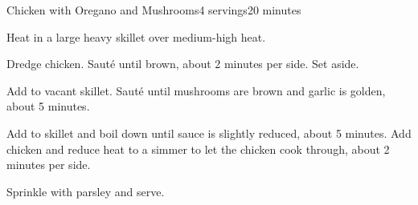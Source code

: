 \documentclass[../Cookbook.tex]{subfiles}
\begin{document}
\begin{recipe}{Chicken with Oregano and Mushrooms}{4 servings}{20 minutes}

Heat in a large heavy skillet over medium-high heat.

Dredge chicken. Saut\'e until brown, about 2 minutes per side. Set aside.

Add to vacant skillet. Saut\'e until mushrooms are brown and garlic is golden, about 5 minutes.

Add to skillet and boil down until sauce is slightly reduced, about 5 minutes. Add chicken and reduce heat to a simmer to let the chicken cook through, about 2 minutes per side.

Sprinkle with parsley and serve.

\end{recipe}
\end{document}
